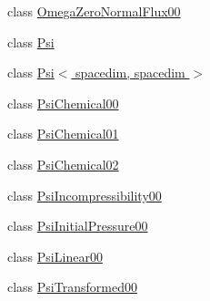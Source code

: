 \begin{DoxyCompactItemize}
\item 
class \hyperlink{classincremental_f_e_1_1_omega_zero_normal_flux00}{Omega\+Zero\+Normal\+Flux00}
\item 
class \hyperlink{classincremental_f_e_1_1_psi}{Psi}
\item 
class \hyperlink{classincremental_f_e_1_1_psi_3_01spacedim_00_01spacedim_01_4}{Psi$<$ spacedim, spacedim $>$}
\item 
class \hyperlink{classincremental_f_e_1_1_psi_chemical00}{Psi\+Chemical00}
\item 
class \hyperlink{classincremental_f_e_1_1_psi_chemical01}{Psi\+Chemical01}
\item 
class \hyperlink{classincremental_f_e_1_1_psi_chemical02}{Psi\+Chemical02}
\item 
class \hyperlink{classincremental_f_e_1_1_psi_incompressibility00}{Psi\+Incompressibility00}
\item 
class \hyperlink{classincremental_f_e_1_1_psi_initial_pressure00}{Psi\+Initial\+Pressure00}
\item 
class \hyperlink{classincremental_f_e_1_1_psi_linear00}{Psi\+Linear00}
\item 
class \hyperlink{classincremental_f_e_1_1_psi_transformed00}{Psi\+Transformed00}
\end{DoxyCompactItemize}
